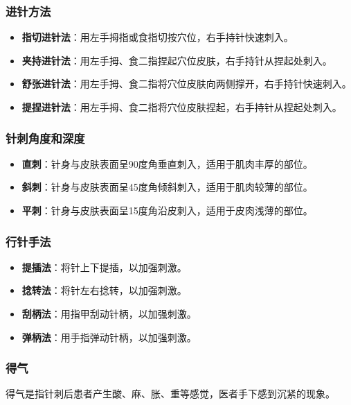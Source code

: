\documentclass[12pt,UTF8]{ctexbook}
\begin{document}
\subsubsection{进针方法}

\begin{itemize}
\item \textbf{指切进针法}：用左手拇指或食指切按穴位，右手持针快速刺入。
\item \textbf{夹持进针法}：用左手拇、食二指捏起穴位皮肤，右手持针从捏起处刺入。
\item \textbf{舒张进针法}：用左手拇、食二指将穴位皮肤向两侧撑开，右手持针快速刺入。
\item \textbf{提捏进针法}：用左手拇、食二指将穴位皮肤捏起，右手持针从捏起处刺入。
\end{itemize}

\subsubsection{针刺角度和深度}

\begin{itemize}
\item \textbf{直刺}：针身与皮肤表面呈90度角垂直刺入，适用于肌肉丰厚的部位。
\item \textbf{斜刺}：针身与皮肤表面呈45度角倾斜刺入，适用于肌肉较薄的部位。
\item \textbf{平刺}：针身与皮肤表面呈15度角沿皮刺入，适用于皮肉浅薄的部位。
\end{itemize}

\subsubsection{行针手法}

\begin{itemize}
\item \textbf{提插法}：将针上下提插，以加强刺激。
\item \textbf{捻转法}：将针左右捻转，以加强刺激。
\item \textbf{刮柄法}：用指甲刮动针柄，以加强刺激。
\item \textbf{弹柄法}：用手指弹动针柄，以加强刺激。
\end{itemize}

\subsubsection{得气}

得气是指针刺后患者产生酸、麻、胀、重等感觉，医者手下感到沉紧的现象。
\end{document}
